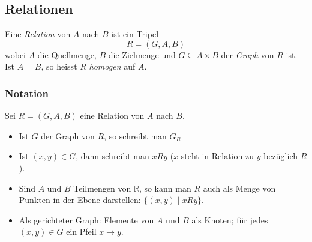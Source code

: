 \subsection{Relationen}
Eine \emph{Relation} von \(A\) nach \(B\) ist ein Tripel
\[
R=(G,A,B)
\]
wobei \(A\) die Quellmenge, \(B\) die Zielmenge und \(G\subseteq A\times B\) der \emph{Graph} von \(R\) ist. Ist \(A=B\), so heisst \(R\) \emph{homogen} auf \(A\).

\subsubsection{Notation}
Sei \(R=(G,A,B)\) eine Relation von \(A\) nach \(B\).
\begin{itemize}
  \item Ist \(G\) der Graph von \(R\), so schreibt man \(G_R\)
  \item Ist \((x,y)\in G\), dann schreibt man \(xRy\) (\(x\) steht in Relation zu \(y\) bezüglich \(R\)).
  \item Sind \(A\) und \(B\) Teilmengen von \(\mathbb{R}\), so kann man \(R\) auch als Menge von Punkten in der Ebene darstellen: \(\{(x,y)\mid xRy\}\).\\
  \item Als gerichteter Graph: Elemente von \(A\) und \(B\) als Knoten; für jedes \((x,y)\in G\) ein Pfeil \(x\to y\).\\
    \begin{tikzpicture}[main/.style = {draw, circle}] 

\end{tikzpicture}
\end{itemize}
